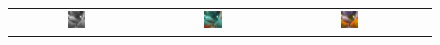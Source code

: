 \documentclass[10pt,twocolumn,letterpaper]{article}
\def\acollumsize{0.14\textwidth}
\begin{document}
\begin{figure}[t!]
\begin{center}
\begin{tabular}{ cccc }
\includegraphics[width=\acollumsize]{img/result/22_in.JPEG}&
\includegraphics[width=\acollumsize]{img/result/22.png}&
\includegraphics[width=\acollumsize]{img/result/22_gt.JPEG}& \\


\end{tabular}
\end{center}
\end{figure}
\end{document}
